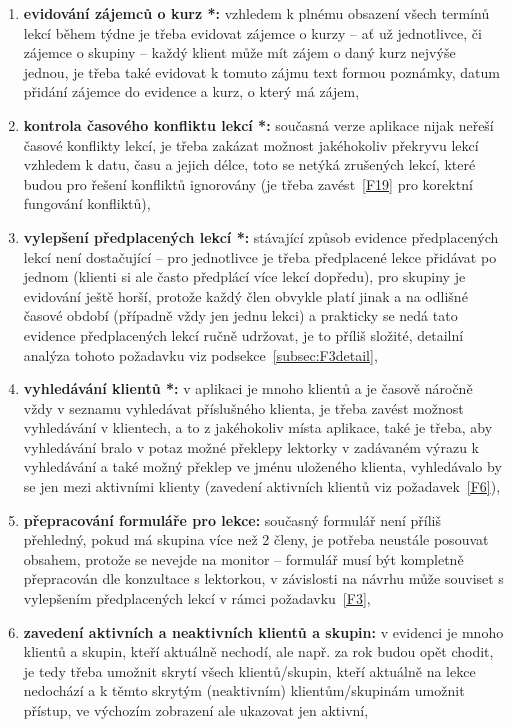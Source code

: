 \begin{enumerate}[label=\textbf{F\arabic*}]
    \item \label{F1} \textbf{evidování zájemců o kurz *:} vzhledem k plnému obsazení všech termínů lekcí během týdne je třeba evidovat zájemce o kurzy -- ať už jednotlivce, či zájemce o skupiny -- každý klient může mít zájem o daný kurz nejvýše jednou, je třeba také evidovat k tomuto zájmu text formou poznámky, datum přidání zájemce do evidence a kurz, o který má zájem,
    \item \label{F2} \textbf{kontrola časového konfliktu lekcí *:} současná verze aplikace nijak neřeší časové konflikty lekcí, je třeba zakázat možnost jakéhokoliv překryvu lekcí vzhledem k datu, času a jejich délce, toto se netýká zrušených lekcí, které budou pro řešení konfliktů ignorovány (je třeba zavést~\ref{F19} pro korektní fungování konfliktů),
    \item \label{F3} \textbf{vylepšení předplacených lekcí *:} stávající způsob evidence předplacených lekcí není dostačující -- pro jednotlivce je třeba předplacené lekce přidávat po jednom (klienti si ale často předplácí více lekcí dopředu), pro skupiny je evidování ještě horší, protože každý člen obvykle platí jinak a na odlišné časové období (případně vždy jen jednu lekci) a prakticky se nedá tato evidence předplacených lekcí ručně udržovat, je to příliš složité, detailní analýza tohoto požadavku viz podsekce~\ref{subsec:F3detail},
    \item \label{F4} \textbf{vyhledávání klientů *:} v aplikaci je mnoho klientů a je časově náročně vždy v seznamu vyhledávat příslušného klienta, je třeba zavést možnost vyhledávání v klientech, a to z jakéhokoliv místa aplikace, také je třeba, aby vyhledávání bralo v potaz možné překlepy lektorky v zadávaném výrazu k vyhledávání a také možný překlep ve jménu uloženého klienta, vyhledávalo by se jen mezi aktivními klienty (zavedení aktivních klientů viz požadavek~\ref{F6}),
    \item \label{F5} \textbf{přepracování formuláře pro lekce:} současný formulář není příliš přehledný, pokud má skupina více než 2 členy, je potřeba neustále posouvat obsahem, protože se nevejde na monitor -- formulář musí být kompletně přepracován dle konzultace s lektorkou, v závislosti na návrhu může souviset s vylepšením předplacených lekcí v rámci požadavku~\ref{F3},
    \item \label{F6} \textbf{zavedení aktivních a neaktivních klientů a skupin:} v evidenci je mnoho klientů a skupin, kteří aktuálně nechodí, ale např. za rok budou opět chodit, je tedy třeba umožnit skrytí všech klientů/skupin, kteří aktuálně na lekce nedochází a k těmto skrytým (neaktivním) klientům/skupinám umožnit přístup, ve výchozím zobrazení ale ukazovat jen aktivní,

\end{enumerate}
